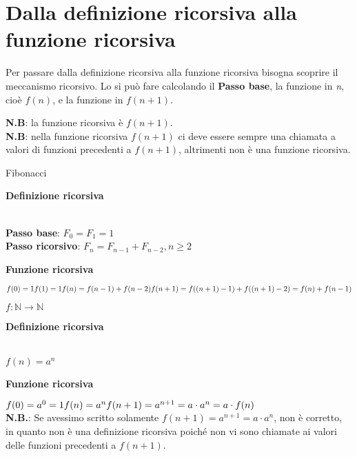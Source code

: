 \section{Dalla definizione ricorsiva alla funzione ricorsiva}
Per passare dalla definizione ricorsiva alla funzione ricorsiva bisogna scoprire il meccanismo ricorsivo. Lo si può fare calcolando il \textbf{Passo base}, la funzione in \textit{n}, cioè $f(n)$, e la funzione in $f(n + 1)$.

\textbf{N.B}: la funzione ricorsiva è $f(n + 1)$. \\
\textbf{N.B}: nella funzione ricorsiva $f(n + 1)$ ci deve essere sempre una chiamata a valori di funzioni precedenti a $f(n + 1)$, altrimenti non è una funzione ricorsiva.
\begin{example}
Fibonacci \\
\centerline{\textbf{Definizione ricorsiva}} \\
\textbf{Passo base}: $F_0 = F_1 = 1$ \\
\textbf{Passo ricorsivo}: $F_n = F_{n - 1} + F_{n - 2}, n \geq 2$ \\
\centerline{\textbf{Funzione ricorsiva}}
$f(0) = 1 \\
f(1) = 1 \\
f(n) = f(n - 1) + f(n - 2) \\ 
f(n + 1) = f((n + 1) - 1) + f((n + 1) - 2) = f(n) + f(n - 1)$ 
\end{example}

\begin{example}
$f: \mathbb{N} \longrightarrow \mathbb{N}$ \\
\centerline{\textbf{Definizione ricorsiva}} \\
$f(n) = a^n$ \\
\centerline{\textbf{Funzione ricorsiva}}
$f(0) = a^0 = 1 \\
f(n) = a^n \\ 
f(n + 1) = a^{n + 1} = a \cdot a^n = a \cdot f(n)$ \\
\textbf{N.B.}: Se avessimo scritto solamente $f(n + 1) = a^{n + 1} = a \cdot a^n$, non è corretto, in quanto non è una definizione ricorsiva poiché non vi sono chiamate ai valori delle funzioni precedenti a $f(n + 1)$.
\end{example}
